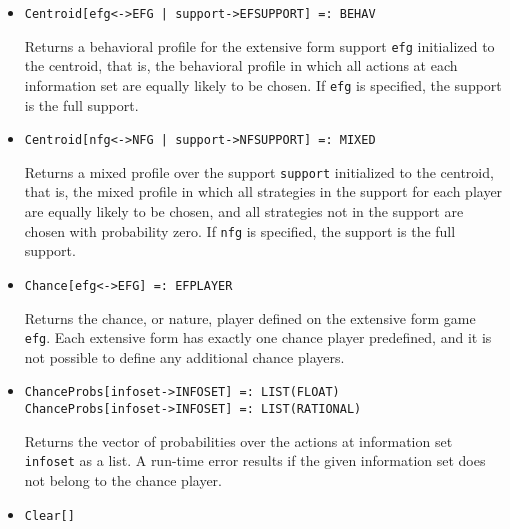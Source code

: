 \begin{itemize}

\item
\protect \large \begin{verbatim} 
Centroid[efg<->EFG | support->EFSUPPORT] =: BEHAV
\end{verbatim}\normalsize

\bd
Returns a behavioral profile for the extensive form
support \verb+efg+ initialized to the centroid, that is, the behavioral
profile in which all actions at each information set are equally
likely to be chosen.  If \verb+efg+ is specified, the support is the
full support.  
\ed

\item
\protect \large \begin{verbatim}
Centroid[nfg<->NFG | support->NFSUPPORT] =: MIXED
\end{verbatim}\normalsize

\bd
Returns a mixed profile over the support \verb+support+
initialized to the centroid, that is, the mixed profile in which 
all strategies in the support for each player are equally likely to be
chosen, and all strategies not in the support are chosen with probability
zero.  If \verb+nfg+ is specified, the support is the full support.  
\ed

\item
\protect \large \begin{verbatim}
Chance[efg<->EFG] =: EFPLAYER
\end{verbatim}\normalsize

\bd
Returns the chance, or nature, player defined on the
extensive form game \verb+efg+.  Each extensive form has exactly one
chance player predefined, and it is not possible to define any additional
chance players.
\ed

\item
\protect \large \begin{verbatim}
ChanceProbs[infoset->INFOSET] =: LIST(FLOAT)
ChanceProbs[infoset->INFOSET] =: LIST(RATIONAL)
\end{verbatim}\normalsize

\bd
Returns the vector of probabilities over the actions at
information set \verb+infoset+ as a list.  A run-time error results if
the given information set does not belong to the chance player.
\ed

\item
\protect \large \begin{verbatim}
Clear[]
\end{verbatim}\normalsize


\end{itemize}

